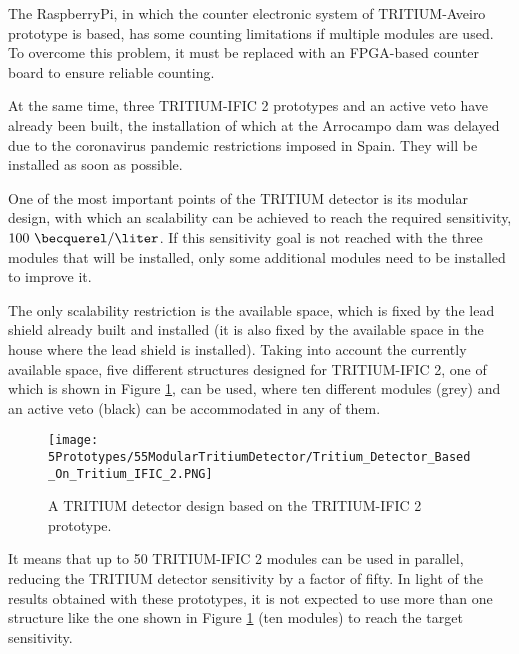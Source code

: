 The RaspberryPi, in which the counter electronic system of TRITIUM-Aveiro prototype is based, has some counting limitations if multiple modules are used. To overcome this problem, it must be replaced with an FPGA-based counter board to ensure reliable counting.

At the same time, three TRITIUM-IFIC 2 prototypes and an active veto have already been built, the installation of which at the Arrocampo dam was delayed due to the coronavirus pandemic restrictions imposed in Spain. They will be installed as soon as possible.

One of the most important points of the TRITIUM detector is its modular design, with which an scalability can be achieved to reach the required sensitivity, $100~\becquerel/\liter$.  If this sensitivity goal is not reached with the three modules that will be installed, only some additional modules need to be installed to improve it.

The only scalability restriction is the available space, which is fixed by the lead shield already built and installed (it is also fixed by the available space in the house where the lead shield is installed). Taking into account the currently available space, five different structures designed for TRITIUM-IFIC 2, one of which is shown in Figure \ref{fig:TritiumMonitorIFIC2Design}, can be used, where ten different modules (grey) and an active veto (black) can be accommodated in any of them. 

\begin{figure}[h]
\centering
\texttt{[image: 5Prototypes/55ModularTritiumDetector/Tritium\_Detector\_Based\_On\_Tritium\_IFIC\_2.PNG]}
\caption{A TRITIUM detector design based on the TRITIUM-IFIC 2 prototype.\label{fig:TritiumMonitorIFIC2Design}}
\end{figure}

It means that up to 50 TRITIUM-IFIC 2 modules can be used in parallel, reducing the TRITIUM detector sensitivity by a factor of fifty. In light of the results obtained with these prototypes, it is not expected to use more than one structure like the one shown in Figure \ref{fig:TritiumMonitorIFIC2Design} (ten modules) to reach the target sensitivity.